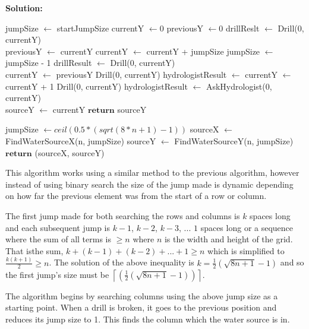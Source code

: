 \documentclass[a4,13pt]{extarticle}
\newenvironment{Solution}{\color{blue}\textbf{Solution:}}{}
\begin{document}
\begin{enumerate}
\begin{enumerate}
\begin{Solution}
\begin{algorithm}
\begin{algorithmic}
							\State jumpSize $\gets$ startJumpSize
							\State currentY $\gets 0$
							\State previousY $\gets 0$
							\State drillReslt $\gets$ Drill(0, currentY)
							\\
								\State previousY $\gets$ currentY
								\State currentY $\gets$ currentY + jumpSize
								\State jumpSize $\gets$ jumpSize - 1
								\State drillResult $\gets$ Drill(0, currentY)
							\EndWhile
							\\
							\State currentY $\gets$ previousY
							\State Drill(0, currentY)
							\State hydrologistResult $\gets$  
								\State currentY $\gets$ currentY + 1
								\State Drill(0, currentY)
								\State hydrologistResult $\gets$ AskHydrologist(0, currentY)
							\EndWhile
							\\
							\State sourceY $\gets$ currentY		
							\State $\textbf{return}$ sourceY
						\EndProcedure
					\end{algorithmic}
				\end{algorithm}
				\medskip
				\begin{algorithm}
					\begin{algorithmic}
							\State jumpSize $\gets ceil(0.5 * (sqrt(8 * n + 1) - 1))$
							\State sourceX $\gets$ FindWaterSourceX(n, jumpSize)
							\State sourceY $\gets$ FindWaterSourceY(n, jumpSize)
							\State $\textbf{return}$ (sourceX, sourceY)
						\EndProcedure
					\end{algorithmic}
				\end{algorithm}
				\medskip\newpage
				This algorithm works using a similar method to the previous algorithm, however instead of using binary search the size of the jump made is dynamic depending on how far the previous element was from the start of a row or column. 

				The first jump made for both searching the rows and columns is $k$ spaces long and each subsequent jump is $k - 1$, $k - 2$, $k - 3$, ... $1$ spaces long or a sequence where the sum of all terms is $\geq n$ where $n$ is the width and height of the grid. That isthe sum, $k + (k - 1) + (k - 2) + ... + 1 \geq n$ which is simplified to $\frac{k(k + 1)}{2} \geq n$. The solution of the above inequality is $k = \frac{1}{2}(\sqrt{8n + 1} - 1)$ and so the first jump's size must be $\left\lceil{(\frac{1}{2}(\sqrt{8n + 1}- 1))}\right\rceil$.

				The algorithm begins by searching columns using the above jump size as a starting point. When a drill is broken, it goes to the previous position and reduces its jump size to 1. This finds the column which the water source is in.


\end{Solution}
\end{enumerate}
\end{enumerate}
\end{document}
